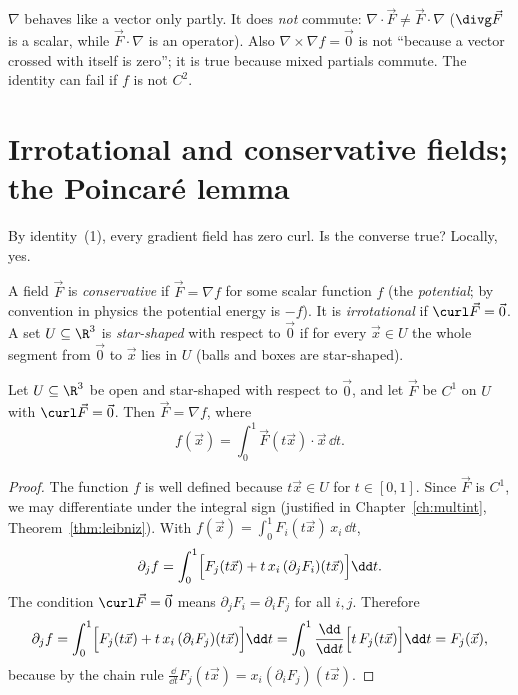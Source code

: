 \begin{pitfall}
$\nabla$ behaves like a vector only partly. It does \emph{not} commute: $\nabla\cdot\vec F\ne\vec F\cdot\nabla$ ($\divg\vec F$ is a scalar, while $\vec F\cdot\nabla$ is an operator). Also $\nabla\times\nabla f=\vec0$ is not ``because a vector crossed with itself is zero''; it is true because mixed partials commute. The identity can fail if $f$ is not $C^2$.
\end{pitfall}

\section{Irrotational and conservative fields; the Poincar\'e lemma}

By identity~(1), every gradient field has zero curl. Is the converse true? Locally, yes.

\begin{definition}
A field $\vec F$ is \emph{conservative} if $\vec F=\nabla f$ for some scalar function $f$ (the \emph{potential}; by convention in physics the potential energy is $-f$). It is \emph{irrotational} if $\curl\vec F=\vec 0$. A set $U\subseteq\R^3$ is \emph{star-shaped} with respect to $\vec 0$ if for every $\vec x\in U$ the whole segment from $\vec 0$ to $\vec x$ lies in $U$ (balls and boxes are star-shaped).
\end{definition}

\begin{theorem}\label{thm:poincare}
Let $U\subseteq\R^3$ be open and star-shaped with respect to $\vec 0$, and let $\vec F$ be $C^1$ on $U$ with $\curl\vec F=\vec 0$. Then $\vec F=\nabla f$, where
\[
f(\vec x)=\int_0^1\vec F(t\vec x)\cdot\vec x\,\dd t .
\]
\end{theorem}

\begin{proof}
The function $f$ is well defined because $t\vec x\in U$ for $t\in[0,1]$. Since $\vec F$ is $C^1$, we may differentiate under the integral sign (justified in Chapter~\ref{ch:multint}, Theorem~\ref{thm:leibniz}). With $f(\vec x)=\int_0^1F_i(t\vec x)\,x_i\,\dd t$,
\[
\partial_jf=\int_0^1\Bigl[F_j(t\vec x)+t\,x_i\,(\partial_jF_i)(t\vec x)\Bigr]\dd t .
\]
The condition $\curl\vec F=\vec 0$ means $\partial_jF_i=\partial_iF_j$ for all $i,j$. Therefore
\[
\partial_jf=\int_0^1\Bigl[F_j(t\vec x)+t\,x_i\,(\partial_iF_j)(t\vec x)\Bigr]\dd t=\int_0^1\frac{\dd}{\dd t}\Bigl[t\,F_j(t\vec x)\Bigr]\dd t=F_j(\vec x),
\]
because by the chain rule $\frac{\dd}{\dd t}F_j(t\vec x)=x_i(\partial_iF_j)(t\vec x)$.
\end{proof}

